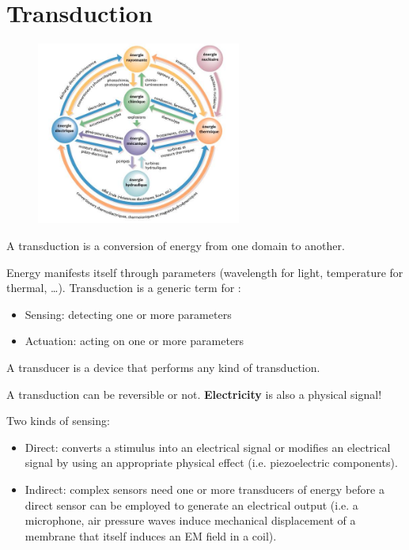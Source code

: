 \section{Transduction}

\begin{figure}[H]
    \centering
    \includegraphics[width = 0.6\textwidth]{L2/img/energy.jpg}
\end{figure}

\begin{mydef}
A transduction is a conversion of energy from one domain to another.
\end{mydef}

Energy manifests itself through parameters (wavelength for light, temperature for thermal, \dots).
Transduction is a generic term for :
\begin{itemize}
    \item Sensing: detecting one or more parameters
    \item Actuation: acting on one or more parameters
\end{itemize}

\begin{mydef}
A transducer is a device that performs any kind
of transduction.
\end{mydef}

A transduction can be reversible or not. \textbf{Electricity} is also a physical signal!

Two kinds of sensing:

\begin{itemize}
    \item Direct: converts a stimulus into an electrical signal or modifies an electrical signal by using an appropriate physical effect (i.e. piezoelectric components).
    \item Indirect: complex sensors need one or more transducers of energy before a direct sensor can be employed to generate an electrical output (i.e. a microphone, air pressure waves induce mechanical displacement of a membrane that itself induces an EM field in a coil).
\end{itemize}

